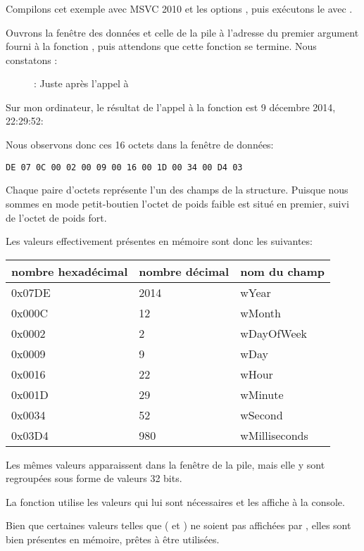 ﻿\clearpage
\subsubsection{\olly}
\myindex{\olly}

Compilons cet exemple avec MSVC 2010 et les options , puis exécutons le avec \olly.

Ouvrons la fenêtre des données et celle de la pile à l'adresse du premier argument fourni à la 
fonction , puis attendons que cette fonction se termine. Nous constatons :

\begin{figure}[H]
\centering
{}
\caption{\olly: Juste après l'appel à }
\label{fig:struct_olly_1}
\end{figure}

Sur mon ordinateur, le résultat de l'appel à la fonction est 9 décembre 2014, 22:29:52:



Nous observons donc ces 16 octets dans la fenêtre de données:
\begin{lstlisting}
DE 07 0C 00 02 00 09 00 16 00 1D 00 34 00 D4 03
\end{lstlisting}

Chaque paire d'octets représente l'un des champs de la structure. 
Puisque nous sommes en mode petit-boutien l'octet de poids faible est situé en premier, suivi de 
l'octet de poids fort.

Les valeurs effectivement présentes en mémoire sont donc les suivantes:

\begin{center}
\begin{tabular}{ | l | l | l | }
\hline
\headercolor{} nombre hexadécimal & 
\headercolor{} nombre décimal & 
\headercolor{} nom du champ \\
\hline
0x07DE & 2014	& wYear \\
\hline
0x000C & 12	& wMonth \\
\hline
0x0002 & 2	& wDayOfWeek \\
\hline
0x0009 & 9	& wDay \\
\hline
0x0016 & 22	& wHour \\
\hline
0x001D & 29	& wMinute \\
\hline
0x0034 & 52	& wSecond \\
\hline	
0x03D4 & 980	& wMilliseconds \\
\hline
\end{tabular}
\end{center}

Les mêmes valeurs apparaissent dans la fenêtre de la pile, mais elle y sont regroupées sous forme 
de valeurs 32 bits.

La fonction \printf utilise les valeurs qui lui sont nécessaires et les affiche à la console.

Bien que certaines valeurs telles que ( et ) ne soient pas 
affichées par \printf, elles sont bien présentes en mémoire, prêtes à être utilisées.
